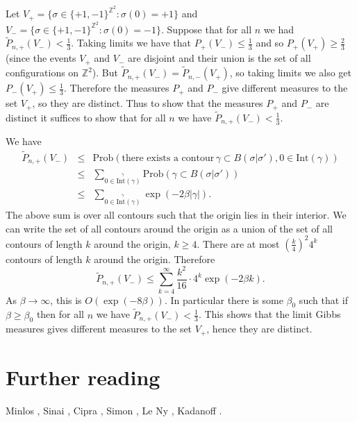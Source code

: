 \documentclass{article}
\newcommand{\Prob}{\text{Prob}}
\newcommand{\Int}{\text{Int}}
\begin{document}
Let $V_+=\{\sigma \in \{+1,-1\}^{\mathbb{Z}^2}: \sigma(0)=+1\}$ and $V_-= \{\sigma \in \{+1,-1\}^{\mathbb{Z}^2}:\sigma(0)=-1\}$. Suppose that for all $n$ we had
$\widetilde{P}_{n,+}(V_-) < \frac{1}{3}$. Taking limits we have that $P_+(V_-) \leq \frac{1}{3}$ and so $P_+(V_+) \geq \frac{2}{3}$ (since the events $V_+$ and $V_-$ are disjoint and their union is the set of all configurations on $\mathbb{Z}^2$). But $\widetilde{P}_{n,+}(V_-)=\widetilde{P}_{n,-}(V_+)$, so taking limits we also get $P_-(V_+) \leq \frac{1}{3}$. Therefore the measures $P_+$ and $P_-$ give different measures to the set $V_+$, so they are distinct. Thus to show that the measures $P_+$ and $P_-$ are distinct it suffices to show that for all $n$ we have $\widetilde{P}_{n,+}(V_-) < \frac{1}{3}$.

We have
\begin{eqnarray*}
\widetilde{P}_{n,+}(V_-)&\leq&\Prob\left(\textrm{there exists a contour} \, \gamma \subset B(\sigma|\sigma'), 0 \in \Int(\gamma)\right)\\
&\leq&\sum_{\stackrel{\gamma}{0 \in \Int(\gamma)}} \Prob(\gamma \subset B(\sigma|\sigma'))\\
&\leq&\sum_{\stackrel{\gamma}{0 \in \Int(\gamma)}} \exp(-2\beta|\gamma|).
\end{eqnarray*}
The above sum is over all contours such that the origin lies in their interior. We can write the set of all contours around the origin as a union of the set of all contours of length $k$ around the origin, $k \geq 4$. There are at most $\left( \frac{k}{4} \right)^2 4^k$ contours of length $k$ around the origin. Therefore
\[
\widetilde{P}_{n,+}(V_-)\leq\sum_{k=4}^\infty \frac{k^2}{16} \cdot 4^k \exp(-2\beta k).
\]
As $\beta \to \infty$, this is $O(\exp(-8\beta))$. In particular there is some $\beta_0$ such that if $\beta \geq \beta_0$ then for all $n$ we have $\widetilde{P}_{n,+}(V_-)< \frac{1}{3}$. This shows
that the limit Gibbs measures gives different measures to the set $V_+$, hence they are distinct. 

\section*{Further reading}
Minlos \cite{minlos}, Sinai \cite{MR691854}, Cipra \cite{MR936054}, Simon \cite{simon},  Le Ny \cite{ny}, Kadanoff \cite{kadanoff}.



\end{document}
